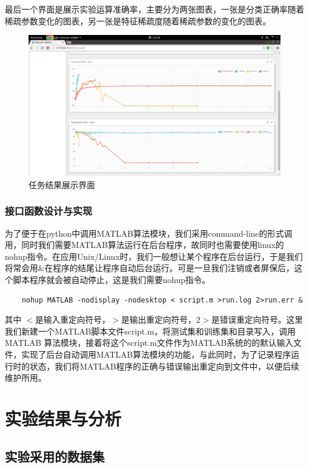 \documentclass[oneside]{ZJUthesis}
\begin{document}
最后一个界面是展示实验运算准确率，主要分为两张图表，一张是分类正确率随着稀疏参数变化的图表，另一张是特征稀疏度随着稀疏参数的变化的图表。
\begin{figure}[H]
\centering
\includegraphics[width=0.7\linewidth]{./Pictures/django03.png}
\caption{任务结果展示界面\label{fig:framework}}
\end{figure}


\subsection{接口函数设计与实现}
为了便于在python中调用MATLAB算法模块，我们采用command-line的形式调用，同时我们需要MATLAB算法运行在后台程序，故同时也需要使用linux的nohup指令。在应用Unix/Linux时，我们一般想让某个程序在后台运行，于是我们将常会用$\&$在程序的结尾让程序自动后台运行。可是一旦我们注销或者屏保后，这个脚本程序就会被自动停止，这是我们需要nohup指令。
\begin{verbatim}
    nohup MATLAB -nodisplay -nodesktop < script.m >run.log 2>run.err & 
\end{verbatim}

其中 $<$是输入重定向符号，$>$是输出重定向符号，$2>$是错误重定向符号。这里我们新建一个MATLAB脚本文件script.m，将测试集和训练集和目录写入，调用 MATLAB 算法模块，接着将这个script.m文件作为MATLAB系统的的默认输入文件，实现了后台自动调用MATLAB算法模块的功能，与此同时，为了记录程序运行时的状态，我们将MATLAB程序的正确与错误输出重定向到文件中，以便后续维护所用。


\chapter{实验结果与分析}
\section{实验采用的数据集}
\end{document}
